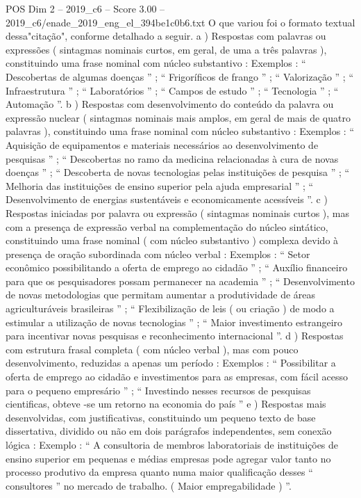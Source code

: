 \begin{textsample}{POS Dim 2 – 2019\_c6 – Score 3.00 – 2019\_c6/enade\_2019\_eng\_el\_394be1c0b6.txt}
O que variou foi o formato textual dessa"citação", conforme detalhado a seguir. a ) Respostas com palavras ou expressões ( sintagmas nominais curtos, em geral, de uma a três palavras ), constituindo uma frase nominal com núcleo substantivo : Exemplos : “ Descobertas de algumas doenças ” ; “ Frigoríficos de frango ” ; “ Valorização ” ; “ Infraestrutura ” ; “ Laboratórios ” ; “ Campos de estudo ” ; “ Tecnologia ” ; “ Automação ”. b ) Respostas com desenvolvimento do conteúdo da palavra ou expressão nuclear ( sintagmas nominais mais amplos, em geral de mais de quatro palavras ), constituindo uma frase nominal com núcleo substantivo : Exemplos : “ Aquisição de equipamentos e materiais necessários ao desenvolvimento de pesquisas ” ; “ Descobertas no ramo da medicina relacionadas à cura de novas doenças ” ; “ Descoberta de novas tecnologias pelas instituições de pesquisa ” ; “ Melhoria das instituições de ensino superior pela ajuda empresarial ” ; “ Desenvolvimento de energias sustentáveis e economicamente acessíveis ”. c ) Respostas iniciadas por palavra ou expressão ( sintagmas nominais curtos ), mas com a presença de expressão verbal na complementação do núcleo sintático, constituindo uma frase nominal ( com núcleo substantivo ) complexa devido à presença de oração subordinada com núcleo verbal : Exemplos : “ Setor econômico possibilitando a oferta de emprego ao cidadão ” ; “ Auxílio financeiro para que os pesquisadores possam permanecer na academia ” ; “ Desenvolvimento de novas metodologias que permitam aumentar a produtividade de áreas agriculturáveis brasileiras ” ; “ Flexibilização de leis ( ou criação ) de modo a estimular a utilização de novas tecnologias ” ; “ Maior investimento estrangeiro para incentivar novas pesquisas e reconhecimento internacional ”. d ) Respostas com estrutura frasal completa ( com núcleo verbal ), mas com pouco desenvolvimento, reduzidas a apenas um período : Exemplos : “ Possibilitar a oferta de emprego ao cidadão e investimentos para as empresas, com fácil acesso para o pequeno empresário ” ; “ Investindo nesses recursos de pesquisas cientificas, obteve -se um retorno na economia do país ” e ) Respostas mais desenvolvidas, com justificativas, constituindo um pequeno texto de base dissertativa, dividido ou não em dois parágrafos independentes, sem conexão lógica : Exemplo : “ A consultoria de membros laboratoriais de instituições de ensino superior em pequenas e médias empresas pode agregar valor tanto no processo produtivo da empresa quanto numa maior qualificação desses “ consultores ” no mercado de trabalho. ( Maior empregabilidade ) ”.

\end{textsample}
